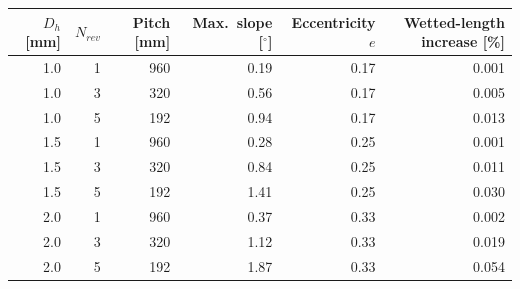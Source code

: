 \begin{tabular}{rrrrrr}
\toprule
$D_h$ [mm] & $N_{rev}$ & Pitch [mm] & Max.\ slope [$^{\circ}$] & Eccentricity $e$ & Wetted-length increase [\%]\\
\midrule
1.0 & 1 & 960 & 0.19 & 0.17 & 0.001\\
1.0 & 3 & 320 & 0.56 & 0.17 & 0.005\\
1.0 & 5 & 192 & 0.94 & 0.17 & 0.013\\
1.5 & 1 & 960 & 0.28 & 0.25 & 0.001\\
1.5 & 3 & 320 & 0.84 & 0.25 & 0.011\\
1.5 & 5 & 192 & 1.41 & 0.25 & 0.030\\
2.0 & 1 & 960 & 0.37 & 0.33 & 0.002\\
2.0 & 3 & 320 & 1.12 & 0.33 & 0.019\\
2.0 & 5 & 192 & 1.87 & 0.33 & 0.054\\
\bottomrule
\end{tabular}
